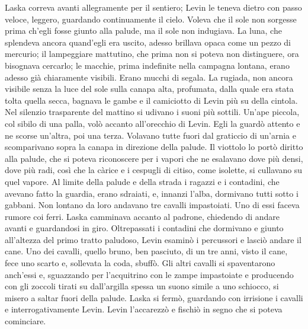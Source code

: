Laska correva avanti allegramente per il sentiero; Levin le teneva dietro con passo veloce, leggero, guardando continuamente il cielo. Voleva che il sole non sorgesse prima ch'egli fosse giunto alla palude, ma il sole non indugiava. La luna, che splendeva ancora quand'egli era uscito, adesso brillava opaca come un pezzo di mercurio; il lampeggiare mattutino, che prima non si poteva non distinguere, ora bisognava cercarlo; le macchie, prima indefinite nella campagna lontana, erano adesso già chiaramente visibili. Erano mucchi di segala. La rugiada, non ancora visibile senza la luce del sole sulla canapa alta, profumata, dalla quale era stata tolta quella secca, bagnava le gambe e il camiciotto di Levin più su della cintola. Nel silenzio trasparente del mattino si udivano i suoni più sottili. Un'ape piccola, col sibilo di una palla, volò accanto all'orecchio di Levin. Egli la guardò attento e ne scorse un'altra, poi una terza. Volavano tutte fuori dal graticcio di un'arnia e scomparivano sopra la canapa in direzione della palude. Il viottolo lo portò diritto alla palude, che si poteva riconoscere per i vapori che ne esalavano dove più densi, dove più radi, così che la càrice e i cespugli di citiso, come isolette, si cullavano su quel vapore. Al limite della palude e della strada i ragazzi e i contadini, che avevano fatto la guardia, erano sdraiati, e, innanzi l'alba, dormivano tutti sotto i gabbani. Non lontano da loro andavano tre cavalli impastoiati. Uno di essi faceva rumore coi ferri. Laska camminava accanto al padrone, chiedendo di andare avanti e guardandosi in giro. Oltrepassati i contadini che dormivano e giunto all'altezza del primo tratto paludoso, Levin esaminò i percussori e lasciò andare il cane. Uno dei cavalli, quello bruno, ben pasciuto, di un tre anni, visto il cane, fece uno scarto e, sollevata la coda, sbuffò. Gli altri cavalli si spaventarono anch'essi e, sguazzando per l'acquitrino con le zampe impastoiate e producendo con gli zoccoli tirati su dall'argilla spessa un suono simile a uno schiocco, si misero a saltar fuori della palude. Laska si fermò, guardando con irrisione i cavalli e interrogativamente Levin. Levin l'accarezzò e fischiò in segno che si poteva cominciare. 

